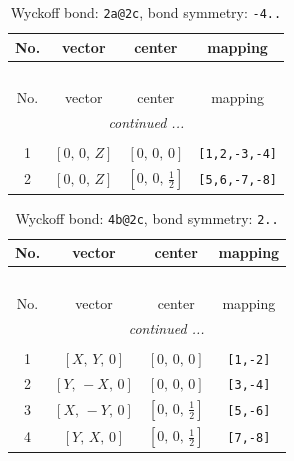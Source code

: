 \documentclass[fleqn,8pt]{jsarticle}
\begin{document}
\begin{longtable}{cccc}
\caption{Wyckoff bond: {\tt 2a@2c}, bond symmetry: {\tt -4..}}
 \\
 \hline \hline
No. & vector & center & mapping \\ \hline \endfirsthead

\multicolumn{3}{l}{\tablename\ \thetable{}} \\
 \hline \hline
No. & vector & center & mapping \\ \hline \endhead

 \hline \hline
\multicolumn{3}{r}{\footnotesize\it continued ...} \\ \endfoot

 \hline \hline
\multicolumn{3}{r}{} \\ \endlastfoot

1 & $\left[ 0,\, 0,\, Z \right]$ & $\left[ 0,\, 0,\, 0 \right]$ & {\tt [1,2,-3,-4]} \\ \hline
2 & $\left[ 0,\, 0,\, Z \right]$ & $\left[ 0,\, 0,\, \frac{1}{2} \right]$ & {\tt [5,6,-7,-8]} \\
\end{longtable}
\renewcommand{\arraystretch}{1.2}
\begin{longtable}{cccc}
\caption{Wyckoff bond: {\tt 4b@2c}, bond symmetry: {\tt 2..}}
 \\
 \hline \hline
No. & vector & center & mapping \\ \hline \endfirsthead

\multicolumn{3}{l}{\tablename\ \thetable{}} \\
 \hline \hline
No. & vector & center & mapping \\ \hline \endhead

 \hline \hline
\multicolumn{3}{r}{\footnotesize\it continued ...} \\ \endfoot

 \hline \hline
\multicolumn{3}{r}{} \\ \endlastfoot

1 & $\left[ X,\, Y,\, 0 \right]$ & $\left[ 0,\, 0,\, 0 \right]$ & {\tt [1,-2]} \\ \hline
2 & $\left[ Y,\, - X,\, 0 \right]$ & $\left[ 0,\, 0,\, 0 \right]$ & {\tt [3,-4]} \\ \hline
3 & $\left[ X,\, - Y,\, 0 \right]$ & $\left[ 0,\, 0,\, \frac{1}{2} \right]$ & {\tt [5,-6]} \\ \hline
4 & $\left[ Y,\, X,\, 0 \right]$ & $\left[ 0,\, 0,\, \frac{1}{2} \right]$ & {\tt [7,-8]} \\
\end{longtable}
\end{document}
